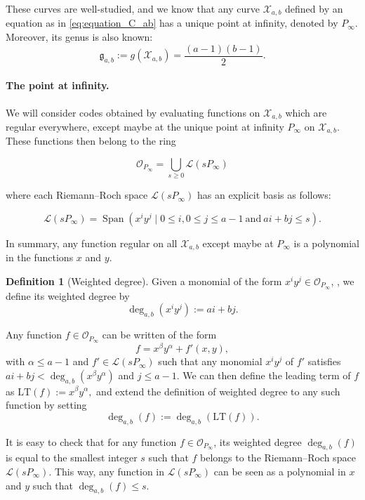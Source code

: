 \documentclass[a4paper]{article}
\theoremstyle{definition}
\newtheorem{definition}[thm]{Definition}
\theoremstyle{remark}
\newcommand{\calL}{\mathcal{L}}
\newcommand{\calO}{\mathcal{O}}
\newcommand{\calX}{\mathcal{X}}
\newcommand{\Span}[1]{\operatorname{Span}\left(#1\right)}
\newcommand{\degab}[1]{\deg_{a,b}\left(#1\right)}
\begin{document}
\noindent These curves are well-studied, and we know that any curve $\calX_{a,b}$ defined by an equation as in \eqref{eq:equation_C_ab} has a unique point at infinity, denoted by $P_{\infty}$. Moreover, its genus is also known:
\[\mathfrak{g}_{a,b}:=g(\calX_{a,b}) = \dfrac{(a-1)(b-1)}{2}.\]




\paragraph{The point at infinity.} We will consider codes obtained by evaluating functions on $\calX_{a,b}$ which are regular everywhere, except maybe at the unique point at infinity $P_\infty$ on $\calX_{a,b}$. These functions then belong to the ring 

\begin{equation}\label{eq:O_Pinf}
\mathcal{O}_{P_\infty}=\bigcup_{s \geq 0} \calL(s P_\infty)
\end{equation}

where each Riemann--Roch space $\calL(s P_\infty)$ has an explicit basis as follows:

\begin{equation} \label{eq:basis_L(sP_inf)}
    \calL(sP_{\infty}) = \Span{x^iy^j \mid 0 \leq i, 0\leq j\leq a-1 \ \mathrm{and} \ ai+bj \leq s}.
\end{equation}

In summary, any function regular on all $\calX_{a,b}$ except maybe at $P_\infty$ is a polynomial in the functions $x$ and $y$. 

\begin{definition}[Weighted degree]
Given a monomial of the form $x^iy^j \in \calO_{P_\infty}$, , we define its weighted degree by
\[ \degab{x^iy^j} := ai+bj.\]

Any function $f \in \calO_{P_\infty}$ can be written of the form $$f = x^{\beta}y^{\alpha} + f'(x,y),$$
with $\alpha \leq a-1$ and $f' \in \calL(sP_{\infty})$ such that any monomial $x^iy^j$ of $f'$ satisfies $ai+bj < \degab{x^{\beta}y^{\alpha}}$ and $j \leq a-1$. We can then define the leading term of $f$ as $\mathrm{LT}(f) := x^{\beta}y^{\alpha},$ and extend the definition of weighted degree to any such function by setting 
\[\degab{f} := \degab{\mathrm{LT}(f)}.\]
\end{definition}

It is easy to check that for any function $f \in \calO_{P_\infty}$, its weighted degree $\degab{f}$ is equal to the smallest integer $s$ such that $f$ belongs to the Riemann--Roch space $\calL(sP_{\infty})$.
%
This way, any function in $\calL(sP_\infty)$ can be seen as a polynomial in $x$ and $y$ such that $\degab{f}\leq s$. 
\end{document}
